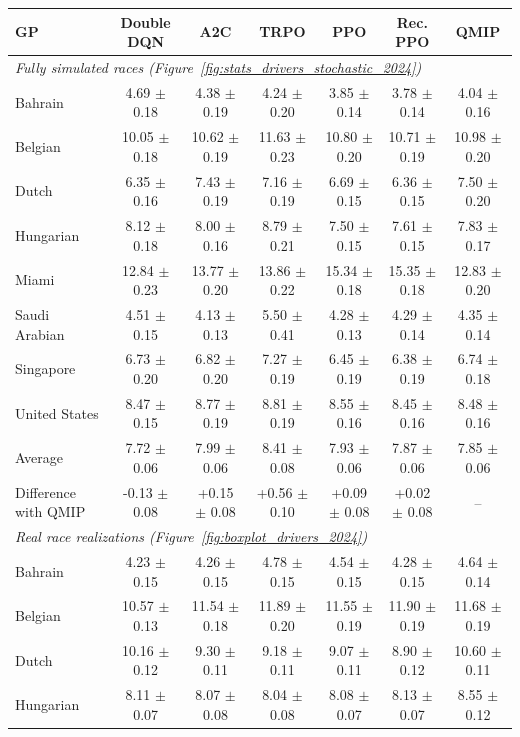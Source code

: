 \begin{tabular}{lcccccc}
\toprule
GP & Double DQN & A2C & TRPO & PPO & Rec. PPO & QMIP \\
\midrule
\multicolumn{7}{l}{\textit{Fully simulated races (Figure~\ref{fig:stats_drivers_stochastic_2024})}} \\
\midrule
Bahrain & 4.69 $\pm$ 0.18 & 4.38 $\pm$ 0.19 & 4.24 $\pm$ 0.20 & 3.85 $\pm$ 0.14 & 3.78 $\pm$ 0.14 & 4.04 $\pm$ 0.16 \\
Belgian & 10.05 $\pm$ 0.18 & 10.62 $\pm$ 0.19 & 11.63 $\pm$ 0.23 & 10.80 $\pm$ 0.20 & 10.71 $\pm$ 0.19 & 10.98 $\pm$ 0.20 \\
Dutch & 6.35 $\pm$ 0.16 & 7.43 $\pm$ 0.19 & 7.16 $\pm$ 0.19 & 6.69 $\pm$ 0.15 & 6.36 $\pm$ 0.15 & 7.50 $\pm$ 0.20 \\
Hungarian & 8.12 $\pm$ 0.18 & 8.00 $\pm$ 0.16 & 8.79 $\pm$ 0.21 & 7.50 $\pm$ 0.15 & 7.61 $\pm$ 0.15 & 7.83 $\pm$ 0.17 \\
Miami & 12.84 $\pm$ 0.23 & 13.77 $\pm$ 0.20 & 13.86 $\pm$ 0.22 & 15.34 $\pm$ 0.18 & 15.35 $\pm$ 0.18 & 12.83 $\pm$ 0.20 \\
Saudi Arabian & 4.51 $\pm$ 0.15 & 4.13 $\pm$ 0.13 & 5.50 $\pm$ 0.41 & 4.28 $\pm$ 0.13 & 4.29 $\pm$ 0.14 & 4.35 $\pm$ 0.14 \\
Singapore & 6.73 $\pm$ 0.20 & 6.82 $\pm$ 0.20 & 7.27 $\pm$ 0.19 & 6.45 $\pm$ 0.19 & 6.38 $\pm$ 0.19 & 6.74 $\pm$ 0.18 \\
United States & 8.47 $\pm$ 0.15 & 8.77 $\pm$ 0.19 & 8.81 $\pm$ 0.19 & 8.55 $\pm$ 0.16 & 8.45 $\pm$ 0.16 & 8.48 $\pm$ 0.16 \\
\midrule
Average & 7.72 $\pm$ 0.06 & 7.99 $\pm$ 0.06 & 8.41 $\pm$ 0.08 & 7.93 $\pm$ 0.06 & 7.87 $\pm$ 0.06 & 7.85 $\pm$ 0.06 \\
Difference with QMIP & -0.13 $\pm$ 0.08 & +0.15 $\pm$ 0.08 & +0.56 $\pm$ 0.10 & +0.09 $\pm$ 0.08 & +0.02 $\pm$ 0.08 & -- \\
\midrule
\multicolumn{7}{l}{\textit{Real race realizations (Figure~\ref{fig:boxplot_drivers_2024})}} \\
\midrule
Bahrain & 4.23 $\pm$ 0.15 & 4.26 $\pm$ 0.15 & 4.78 $\pm$ 0.15 & 4.54 $\pm$ 0.15 & 4.28 $\pm$ 0.15 & 4.64 $\pm$ 0.14 \\
Belgian & 10.57 $\pm$ 0.13 & 11.54 $\pm$ 0.18 & 11.89 $\pm$ 0.20 & 11.55 $\pm$ 0.19 & 11.90 $\pm$ 0.19 & 11.68 $\pm$ 0.19 \\
Dutch & 10.16 $\pm$ 0.12 & 9.30 $\pm$ 0.11 & 9.18 $\pm$ 0.11 & 9.07 $\pm$ 0.11 & 8.90 $\pm$ 0.12 & 10.60 $\pm$ 0.11 \\
Hungarian & 8.11 $\pm$ 0.07 & 8.07 $\pm$ 0.08 & 8.04 $\pm$ 0.08 & 8.08 $\pm$ 0.07 & 8.13 $\pm$ 0.07 & 8.55 $\pm$ 0.12 \\

\end{tabular}
